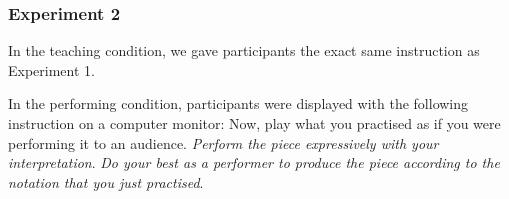\documentclass[
  english,
  man,floatsintext]{apa6}
\begin{document}
\hypertarget{experiment-2-1}{%
\subsubsection{Experiment 2}\label{experiment-2-1}}

In the teaching condition, we gave participants the exact same instruction as Experiment 1.

In the performing condition, participants were displayed with the following instruction on a computer monitor: Now, play what you practised as if you were performing it to an audience. \emph{Perform the piece expressively with your interpretation}. \emph{Do your best as a performer to produce the piece according to the notation that you just practised}.
\end{document}
